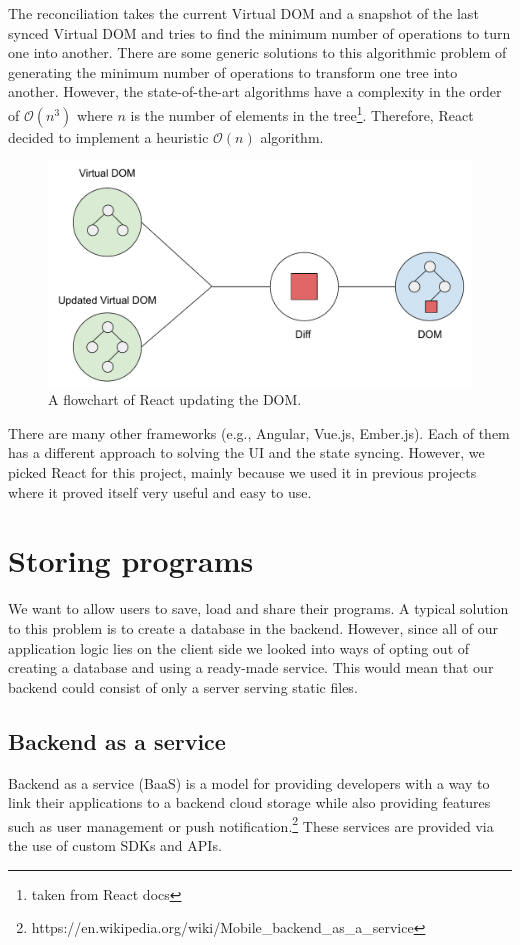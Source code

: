 The reconciliation takes the current Virtual DOM and a snapshot of the last synced Virtual DOM and tries to find the minimum number of operations to turn
one into another. There are some generic solutions to this algorithmic problem of generating the minimum number of operations to transform one tree into another.
However, the state-of-the-art algorithms \cite{TreeEditDistance} have a complexity in the order of $\mathcal{O}(n^3)$ where $n$ is the number of elements in
the tree\footnote{taken from React docs}. Therefore, React decided to implement a heuristic $\mathcal{O}(n)$ algorithm.

\begin{figure}[!hbt]
    \centering
	\includegraphics[width=\textwidth]{../img/virtual_dom}
	\caption{A flowchart of React updating the DOM.}
	\label{fig:chap2:virtual_dom}
\end{figure}

There are many other frameworks (e.g., Angular, Vue.js, Ember.js). Each of them has a different approach to solving the UI and the state syncing. However, we picked
React for this project, mainly because we used it in previous projects where it proved itself very useful and easy to use.

\section{Storing programs}
We want to allow users to save, load and share their programs. A typical solution to this problem is to create a database in the backend. However, since all
of our application logic lies on the client side we looked into ways of opting out of creating a database and using a ready-made service. This would mean that
our backend could consist of only a server serving static files.

\subsection{Backend as a service}
Backend as a service (BaaS) is a model for providing developers with a way to link their applications to a backend cloud storage while also providing features
such as user management or push notification.\footnote{https://en.wikipedia.org/wiki/Mobile\_backend\_as\_a\_service} These services are provided via
the use of custom SDKs and APIs.

